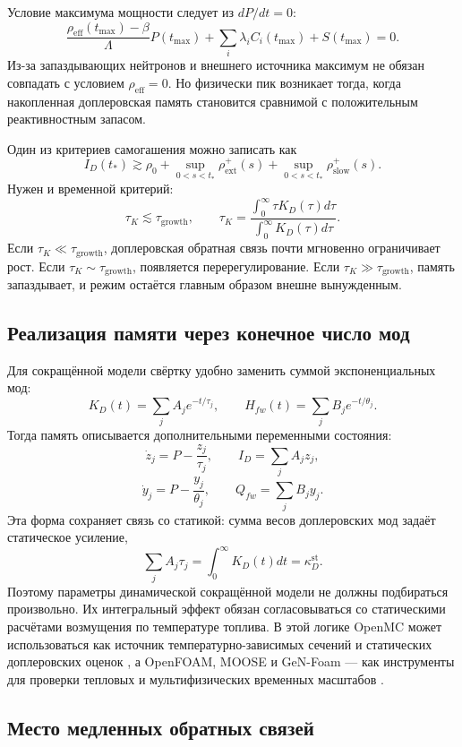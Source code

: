 \documentclass[12pt]{article}
\begin{document}
Условие максимума мощности следует из \(dP/dt=0\):
\[
\frac{\rho_{\mathrm{eff}}(t_{\max})-\beta}{\Lambda}P(t_{\max})
+
\sum_i\lambda_iC_i(t_{\max})+S(t_{\max})=0.
\]
Из-за запаздывающих нейтронов и внешнего источника максимум не обязан совпадать с условием \(\rho_{\mathrm{eff}}=0\). Но физически пик возникает тогда, когда накопленная доплеровская память становится сравнимой с положительным реактивностным запасом.

Один из критериев самогашения можно записать как
\[
\boxed{
I_D(t_*)
\gtrsim
\rho_0+
\sup_{0<s<t_*}\rho_{\mathrm{ext}}^+(s)+
\sup_{0<s<t_*}\rho_{\mathrm{slow}}^+(s).
}
\]
Нужен и временной критерий:
\[
\tau_K\lesssim\tau_{\mathrm{growth}},
\qquad
\tau_K=
\frac{\int_0^\infty\tau K_D(\tau)d\tau}{\int_0^\infty K_D(\tau)d\tau}.
\]
Если \(\tau_K\ll\tau_{\mathrm{growth}}\), доплеровская обратная связь почти мгновенно ограничивает рост. Если \(\tau_K\sim\tau_{\mathrm{growth}}\), появляется перерегулирование. Если \(\tau_K\gg\tau_{\mathrm{growth}}\), память запаздывает, и режим остаётся главным образом внешне вынужденным.

\subsection{Реализация памяти через конечное число мод}

Для сокращённой модели свёртку удобно заменить суммой экспоненциальных мод:
\[
K_D(t)=\sum_jA_je^{-t/\tau_j},
\qquad
H_{fw}(t)=\sum_jB_je^{-t/\theta_j}.
\]
Тогда память описывается дополнительными переменными состояния:
\[
\dot z_j=P-\frac{z_j}{\tau_j},
\qquad
I_D=\sum_jA_jz_j,
\]
\[
\dot y_j=P-\frac{y_j}{\theta_j},
\qquad
Q_{fw}=\sum_jB_jy_j.
\]
Эта форма сохраняет связь со статикой: сумма весов доплеровских мод задаёт статическое усиление,
\[
\sum_jA_j\tau_j
=
\int_0^\infty K_D(t)dt
=
\kappa_D^{\mathrm{st}}.
\]
Поэтому параметры динамической сокращённой модели не должны подбираться произвольно. Их интегральный эффект обязан согласовываться со статическими расчётами возмущения по температуре топлива. В этой логике OpenMC может использоваться как источник температурно-зависимых сечений и статических доплеровских оценок \cite{OpenMCCrossSections}, а OpenFOAM, MOOSE и GeN-Foam --- как инструменты для проверки тепловых и мультифизических временных масштабов \cite{MOOSEHeatTransfer,OpenFOAMSolvers,GeNFoam2015}.

\subsection{Место медленных обратных связей}
\end{document}

